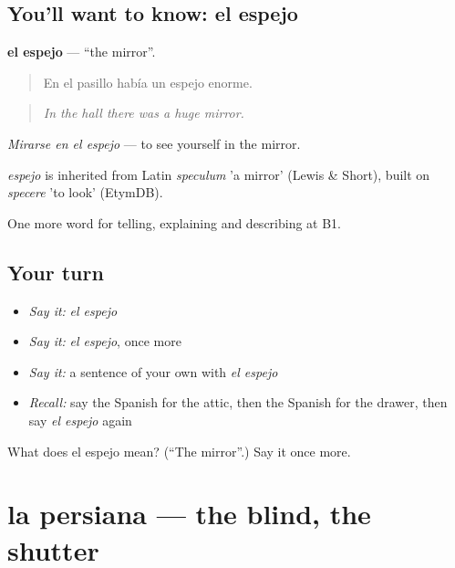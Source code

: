 \subsection*{You'll want to know: el espejo}
\textbf{el espejo} — \textquotedblleft{}the mirror\textquotedblright{}.

\begin{quote}
En el pasillo había un espejo enorme.
\end{quote}

\begin{quote}
\emph{In the hall there was a huge mirror.}
\end{quote}

\emph{Mirarse en el espejo} — to see yourself in the mirror.

\begin{cousinweb}
\emph{espejo} is inherited from Latin \emph{speculum} 'a mirror' (Lewis \& Short), built on \emph{specere} 'to look' (EtymDB).
\end{cousinweb}

\begin{grammarlens}[title={What you've built}]
One more word for telling, explaining and describing at B1.
\end{grammarlens}

\subsection*{Your turn}
\begin{itemize}
\raggedright
  \item \emph{Say it:} \emph{el espejo}
  \item \emph{Say it:} \emph{el espejo}, once more
  \item \emph{Say it:} a sentence of your own with \emph{el espejo}
  \item \emph{Recall:} say the Spanish for the attic, then the Spanish for the drawer, then say \emph{el espejo} again
\end{itemize}

\begin{tcolorbox}[breakable,colback=teal!4,colframe=teal!35!black,title={Before you move on}]
What does el espejo mean? (\textquotedblleft{}The mirror\textquotedblright{}.) Say it once more.
\end{tcolorbox}
\section[la persiana]{la persiana — the blind, the shutter}

